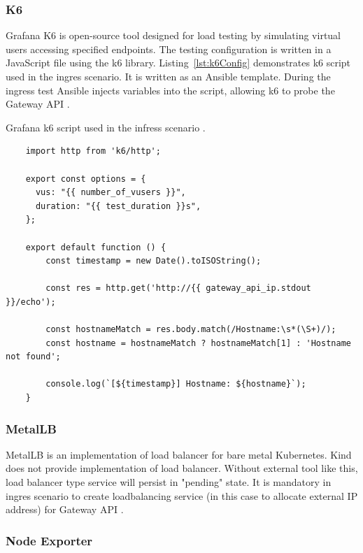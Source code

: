 \subsubsection{K6}
\label{sec:k6}

Grafana K6 is open-source tool designed for load testing by simulating virtual users accessing specified endpoints. The testing configuration is written in a JavaScript file using the k6 library. Listing~\ref{lst:k6Config} demonstrates k6 script used in the ingres scenario. It is written as an Ansible template. During the ingress test Ansible injects variables into the script, allowing k6 to probe the Gateway API \cite{AnsibleTemplates}.


\begin{listing}[H]
  \centering
  \caption{Grafana k6 script used in the infress scenario \cite{K6HTTP}.}
  \begin{verbatim}
    import http from 'k6/http';

    export const options = {
      vus: "{{ number_of_vusers }}",
      duration: "{{ test_duration }}s",
    };

    export default function () {
        const timestamp = new Date().toISOString();

        const res = http.get('http://{{ gateway_api_ip.stdout }}/echo');

        const hostnameMatch = res.body.match(/Hostname:\s*(\S+)/);
        const hostname = hostnameMatch ? hostnameMatch[1] : 'Hostname not found';

        console.log(`[${timestamp}] Hostname: ${hostname}`);
    }
  \end{verbatim}
  \label{lst:k6Config}
\end{listing}

\subsubsection{MetalLB}
\label{sec:metallb}

MetalLB is an implementation of load balancer for bare metal Kubernetes. Kind does not provide implementation of load balancer. Without external tool like this, load balancer type service will persist in "pending" state. It is mandatory in ingres scenario to create loadbalancing service (in this case to allocate external IP address) for Gateway API \cite{MetalLB}.

\subsubsection{Node Exporter}
\label{sec:nodeExporter}

